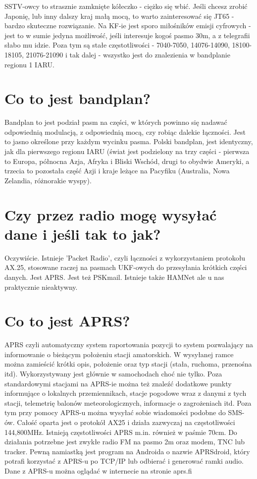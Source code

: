 \documentclass[a4paper,12pt]{article}
\begin{document}
SSTV-owcy to strasznie zamknięte kółeczko - ciężko się wbić. Jeśli chcesz zrobić Japonię, lub inny dalszy kraj małą mocą, to warto zainteresować się JT65 - bardzo skuteczne rozwiązanie. Na KF-ie jest sporo miłośników emisji cyfrowych - jest to w sumie jedyna możliwość, jeśli interesuje kogoś pasmo 30m, a z telegrafii słabo mu idzie. Poza tym są stałe częstotliwości - 7040-7050, 14076-14090, 18100-18105, 21076-21090 i tak dalej - wszystko jest do znalezienia w bandplanie regionu 1 IARU.

\section{Co to jest bandplan?}
Bandplan to jest podział pasm na części, w których powinno się nadawać odpowiednią modulacją, z odpowiednią mocą, czy robiąc dalekie łączności. Jest to jasno określone przy każdym wycinku pasma. 
Polski bandplan, jest identyczny, jak dla pierwszego regionu IARU (świat jest podzielony na trzy części - pierwsza to Europa, północna Azja, Afryka i Bliski Wschód, drugi to obydwie Ameryki, a trzecia to pozostała część Azji i kraje leżące na Pacyfiku (Australia, Nowa Zelandia, różnorakie wyspy).

\section{Czy przez radio mogę wysyłać dane i jeśli tak to jak?}
Oczywiście. Istnieje 'Packet Radio', czyli łączności z wykorzystaniem protokołu AX.25, stosowane raczej na pasmach UKF-owych do przesyłania krótkich części danych.
Jest APRS.
Jest też PSKmail.
Istnieje także HAMNet ale u nas praktycznie nieaktywny.

\section{Co to jest APRS?}
APRS czyli automatyczny system raportowania pozycji to system pozwalający na informowanie o bieżącym położeniu stacji amatorskich. W wysyłanej ramce można zamieścić krótki opis, położenie oraz typ stacji (stała, ruchoma, przenośna itd). Wykorzystywany jest głównie w samochodach choć nie tylko. Poza standardowymi stacjami na APRS-ie można też znaleźć dodatkowe punkty informujące o lokalnych przemiennikach, stacje pogodowe wraz z danymi z tych stacji, telemetrię balonów meteorologicznych, informacje o zagrożeniach itd. 
Poza tym przy pomocy APRS-u można wysyłać sobie wiadomości podobne do SMS-ów.
Całość oparta jest o protokół AX25 i działa zazwyczaj na częstotliwości 144,800MHz. Istnieją częstotliwości APRS m.in. również w paśmie 70cm.
Do działania potrzebne jest zwykłe radio FM na pasmo 2m oraz modem, TNC lub tracker. 
Pewną namiastką jest program na Androida o nazwie APRSdroid, który potrafi korzystać z APRS-u po TCP/IP lub odbierać i generować ramki audio.
Dane z APRS-u można oglądać w internecie na stronie aprs.fi
\end{document}
